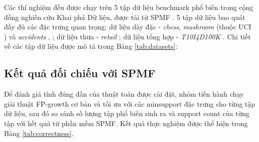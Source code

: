 \documentclass[conference]{IEEEtran}
\begin{document}
Các thí nghiệm đều được chạy trên 5 tập dữ liệu benchmark phổ biến trong cộng đồng nghiên cứu Khai phá Dữ liệu, được tải từ SPMF \cite{fournierviger2014spmf}. 5 tập dữ liệu bao quát đầy đủ các đặc trưng quan trọng: dữ liệu dày đặc - \textit{chess}, \textit{mushroom} (thuộc UCI \cite{uci1998repository}) và \textit{accidents} \cite{geurts2003profiling}, ; dữ liệu thưa - \textit{retail} \cite{brijs1999using}; dữ liệu tổng hợp - \textit{T10I4D100K} \cite{agrawal1994fast}. Chi tiết về các tập dữ liệu được mô tả trong Bảng \ref{tab:datasets}:

\begin{table}[htbp]
\centering
\caption{Thống kê các tập dữ liệu benchmark được sử dụng \cite{fournierviger2014spmf}}
\label{tab:datasets}
\setlength{\tabcolsep}{3.5pt}
\renewcommand{\arraystretch}{1.15}
\end{table}

\subsection{Kết quả đối chiếu với SPMF}
Để đánh giá tính đúng đắn của thuật toán được cài đặt, nhóm tiến hành chạy giải thuật FP-growth cơ bản và tối ưu với các minsupport đặc trưng cho từng tập dữ liệu, sau đó so sánh số lượng tập phổ biến sinh ra và support count của từng tập với kết quả từ phần mềm SPMF. Kết quả thực nghiệm được thể hiện trong Bảng \ref{tab:correctness}.
\end{document}
